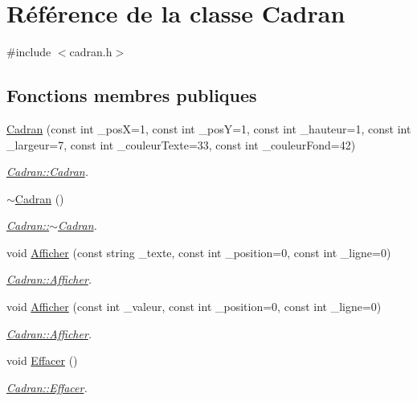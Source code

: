 \hypertarget{class_cadran}{}\section{Référence de la classe Cadran}
\label{class_cadran}


{\ttfamily \#include $<$cadran.\+h$>$}

\subsection*{Fonctions membres publiques}
\begin{DoxyCompactItemize}
\item 
\hyperlink{class_cadran_a404433296315584a9aae88da868b224d}{Cadran} (const int \+\_\+posX=1, const int \+\_\+posY=1, const int \+\_\+hauteur=1, const int \+\_\+largeur=7, const int \+\_\+couleur\+Texte=33, const int \+\_\+couleur\+Fond=42)
\begin{DoxyCompactList}\small\item\em \hyperlink{class_cadran_a404433296315584a9aae88da868b224d}{Cadran\+::\+Cadran}. \end{DoxyCompactList}\item 
\hyperlink{class_cadran_ae710cda2ec2d5b84d33599a9dc37893b}{$\sim$\+Cadran} ()
\begin{DoxyCompactList}\small\item\em \hyperlink{class_cadran_ae710cda2ec2d5b84d33599a9dc37893b}{Cadran\+::$\sim$\+Cadran}. \end{DoxyCompactList}\item 
void \hyperlink{class_cadran_a260c1d98132eafc7a1d8b9065c2bc172}{Afficher} (const string \+\_\+texte, const int \+\_\+position=0, const int \+\_\+ligne=0)
\begin{DoxyCompactList}\small\item\em \hyperlink{class_cadran_a260c1d98132eafc7a1d8b9065c2bc172}{Cadran\+::\+Afficher}. \end{DoxyCompactList}\item 
void \hyperlink{class_cadran_aed8613bcdc6d30cf52d99c059ae0b770}{Afficher} (const int \+\_\+valeur, const int \+\_\+position=0, const int \+\_\+ligne=0)
\begin{DoxyCompactList}\small\item\em \hyperlink{class_cadran_a260c1d98132eafc7a1d8b9065c2bc172}{Cadran\+::\+Afficher}. \end{DoxyCompactList}\item 
void \hyperlink{class_cadran_ae0241c088e1b351fb8bcbd2c6436cac9}{Effacer} ()
\begin{DoxyCompactList}\small\item\em \hyperlink{class_cadran_ae0241c088e1b351fb8bcbd2c6436cac9}{Cadran\+::\+Effacer}. \end{DoxyCompactList}\end{DoxyCompactItemize}
